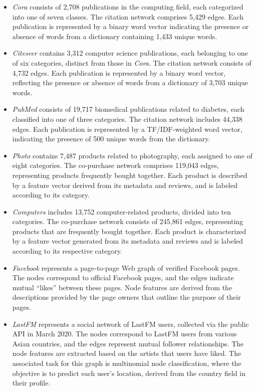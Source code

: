 \begin{itemize}[leftmargin=*]
    \item \emph{Cora} \cite{mccallum2000automating} consists of 2,708 publications in the computing field, each categorized into one of seven classes. The citation network comprises 5,429 edges. Each publication is represented by a binary word vector indicating the presence or absence of words from a dictionary containing 1,433 unique words.
    \item \emph{Citeseer}\cite{sen2008collective} contains 3,312 computer science publications, each belonging to one of six categories, distinct from those in \textit{Cora}. The citation network consists of 4,732 edges. Each publication is represented by a binary word vector, reflecting the presence or absence of words from a dictionary of 3,703 unique words.
    \item \emph{PubMed} \cite{sen2008collective} consists of 19,717 biomedical publications related to diabetes, each classified into one of three categories. The citation network includes 44,338 edges. Each publication is represented by a TF/IDF-weighted word vector, indicating the presence of 500 unique words from the dictionary.
    \item \emph{Photo} \cite{shchur2018pitfalls} contains 7,487 products related to photography, each assigned to one of eight categories. The co-purchase network comprises 119,043 edges, representing products frequently bought together. Each product is described by a feature vector derived from its metadata and reviews, and is labeled according to its category.
    \item \emph{Computers} \cite{shchur2018pitfalls} includes 13,752 computer-related products, divided into ten categories. The co-purchase network consists of 245,861 edges, representing products that are frequently bought together. Each product is characterized by a feature vector generated from its metadata and reviews and is labeled according to its respective category.
    \item \emph{Facebook} \cite{rozemberczki2021multi} represents a page-to-page Web graph of verified Facebook pages. The nodes correspond to official Facebook pages, and the edges indicate mutual ``likes'' between these pages. Node features are derived from the descriptions provided by the page owners that outline the purpose of their pages.
    \item \emph{LastFM} \cite{rozemberczki2020characteristic} represents a social network of LastFM users, collected via the public API in March 2020. The nodes correspond to LastFM users from various Asian countries, and the edges represent mutual follower relationships. The node features are extracted based on the artists that users have liked. The associated task for this graph is multinomial node classification, where the objective is to predict each user's location, derived from the country field in their profile.
\end{itemize}



